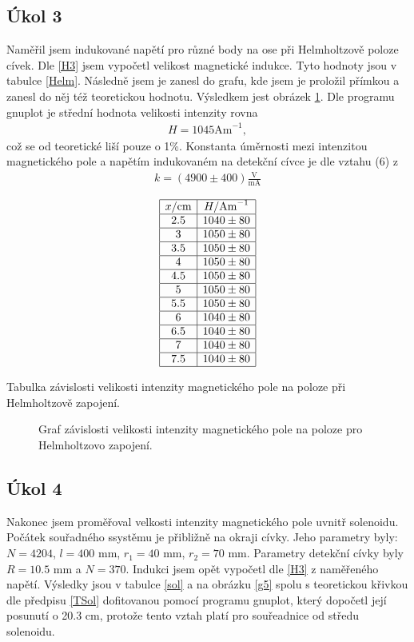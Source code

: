 \documentclass[a4paper,12pt]{article}
\begin{document}
\subsection{Úkol 3}
Naměřil jsem indukované napětí pro různé body na ose při Helmholtzově poloze cívek. Dle \ref{H3} jsem vypočetl velikost magnetické indukce. 
Tyto hodnoty jsou v tabulce \ref{Helm}. Následně jsem je zanesl do grafu, kde jsem je proložil přímkou a zanesl do něj též teoretickou hodnotu. 
Výsledkem jest obrázek \ref{g4}. Dle programu gnuplot je střední hodnota velikosti intenzity rovna
\begin{eqnarray}
H=1045 \mbox{Am}^{-1}, 
\end{eqnarray}
což se od teoretické liší pouze o 1\%. Konstanta úměrnosti mezi intenzitou magnetického pole a napětím indukovaném na detekční cívce je dle vztahu (6) z \cite{text}
\begin{eqnarray}
k=(4900\pm400)\frac{\mbox{V}}{\mbox{mA}}
\label{k}
\end{eqnarray}

\begin{table}
$$
\begin{array}{|c|c|}
\hline
x/\mbox{cm}&    H/\mbox{Am}^{-1} \\ \hline
2.5&    1040\pm80   \\ \hline
3&  1050\pm 80  \\ \hline
3.5&    1050\pm80   \\ \hline
4&  1050\pm80   \\ \hline
4.5&    1050\pm80   \\ \hline
5&  1050\pm80   \\ \hline
5.5&    1050\pm80   \\ \hline
6&  1040\pm80   \\ \hline
6.5&    1040\pm80   \\ \hline
7&  1040\pm80   \\ \hline
7.5&    1040\pm80   \\ \hline
\end{array}
$$
\caption{Tabulka závislosti velikosti intenzity magnetického pole na poloze při Helmholtzově zapojení. }
\label{Helm}
\end{table}

\begin{figure}

\caption{Graf závislosti velikosti intenzity magnetického pole na poloze pro Helmholtzovo zapojení.}
\label{g4}
\end{figure}

\subsection{Úkol 4}
Nakonec jsem proměřoval velkosti intenzity magnetického pole uvnitř solenoidu. Počátek souřadného ssystěmu je přibližně na okraji cívky. 
Jeho parametry byly: $N=4204$, $l=400$ mm, $r_1=40$ mm, $r_2=70$ mm. Parametry detekční cívky byly $R=10.5$ mm a $N=370$. 
Indukci jsem opět vypočetl dle \ref{H3} z naměřeného napětí. Výsledky jsou v tabulce \ref{sol} a na obrázku \ref{g5} spolu 
s teoretickou křivkou dle předpisu \ref{TSol} dofitovanou pomocí programu gnuplot, který dopočetl její posunutí o 20.3 cm, protože tento vztah platí pro souřeadnice od středu solenoidu.
\end{document}

